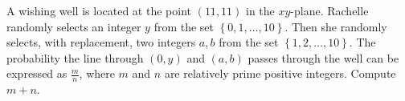 A wishing well is located at the point $(11,11)$ in the $xy$-plane. Rachelle randomly selects an integer $y$ from the set $\left\{ 0, 1, \dots, 10 \right\}$.  Then she randomly selects, with replacement, two integers $a,b$ from the set $\left\{ 1,2,\dots,10 \right\}$.  The probability the line through $(0,y)$ and $(a,b)$ passes through the well can be expressed as $\frac mn$, where $m$ and $n$ are relatively prime positive integers.  Compute $m+n$.
